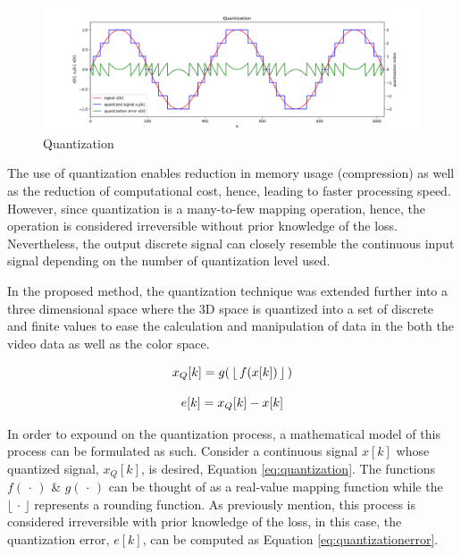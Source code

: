 \begin{figure}[hbt!]\centering
\includegraphics[width=\textwidth]{image/general/quantization.png}
\caption{Quantization}
\end{figure}


The use of quantization enables reduction in memory usage (compression) as well as the reduction of computational cost, hence, leading to faster processing speed. However, since quantization is a many-to-few mapping operation, hence, the operation is considered irreversible without prior knowledge of the loss. Nevertheless, the output discrete signal can closely resemble the continuous input signal depending on the number of quantization level used.

In the proposed method, the quantization technique was extended further into a three dimensional space where the 3D space is quantized into a set of discrete and finite values to ease the calculation and manipulation of data in the both the video data as well as the color space. 

\begin{equation}\centering
\label{eq:quantization}
x_Q[k] = g( \mspace{3mu}\lfloor \mspace{3mu}f(x[k]) \mspace{3mu}\rfloor\mspace{3mu})
\end{equation} 

\vspace{-3em}


\begin{equation}\centering
\label{eq:quantizationerror}
e[k] = x_Q[k] - x[k]
\end{equation}


In order to expound on the quantization process, a mathematical model of this process can be formulated as such. Consider a continuous signal $x[k]$ whose quantized signal, $x_Q[k]$, is desired, Equation \ref{eq:quantization}. The functions $f (\mspace{3mu} \cdot  \mspace{3mu})$ \& $g (\mspace{3mu} \cdot  \mspace{3mu})$ can be thought of as a real-value mapping function while the $\lfloor \mspace{3mu} \cdot  \mspace{3mu} \rfloor$ represents a rounding function. As previously mention, this process is considered irreversible with prior knowledge of the loss, in this case, the quantization error, $e[k]$, can be computed as Equation \ref{eq:quantizationerror}. 

